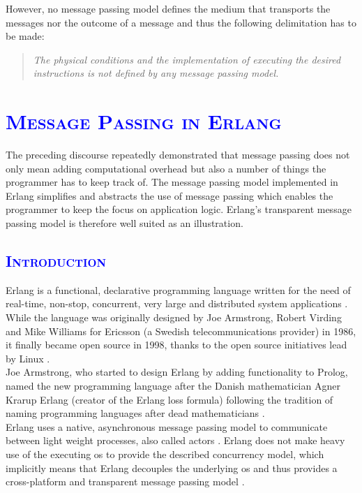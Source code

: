 \documentclass[xcolor=dvipsnames]{article}
\begin{document}
\noindent However, no message passing model defines the medium that transports the messages nor the outcome of a message and thus the following delimitation has to be made:

\begin{quote}
\textit{The physical conditions and the implementation of executing the desired instructions is not defined by any message passing model.}
\end{quote}

\section{\scshape{\textcolor{blue}{Message Passing in Erlang}}} \label{erlang}

The preceding discourse repeatedly demonstrated that message passing does not only mean adding computational overhead but also a number of things the programmer has to keep track of. The message passing model implemented in Erlang simplifies and abstracts the use of message passing which enables the programmer to keep the focus on application logic. Erlang's transparent message passing model is therefore well suited as an illustration.

\subsection{\scshape{\textcolor{blue}{Introduction}}}

Erlang is a functional, declarative programming language written for the need of real-time, non-stop, concurrent, very large and distributed system applications \cite[chap. 1 / p. 1]{Armstrong96erlang}. While the language was originally designed by Joe Armstrong, Robert Virding and Mike Williams for Ericsson (a Swedish telecommunications provider) in 1986, it finally became open source in 1998, thanks to the open source initiatives lead by Linux \cite[chap. 8 on p. 39]{erl_history}.\\

\noindent Joe Armstrong, who started to design Erlang by adding functionality to Prolog, named the new programming language after the Danish mathematician \sloppy Agner \sloppy Krarup  Erlang (creator of the Erlang loss formula) following the tradition of naming programming languages after dead mathematicians \cite[chap. 4.1 on p. 13]{erl_history}.\\

\noindent Erlang uses a native, asynchronous message passing model to communicate between light weight processes, also called actors \cite[chap. 1 on p. 1]{Armstrong96erlang}. Erlang does not make heavy use of the executing \gls{os} to provide the described concurrency model, which implicitly means that Erlang decouples the underlying \gls{os} and thus provides a cross-platform and transparent message passing model \cite[chap. 1  \& 3 on p. 1 - 3]{Armstrong96erlang}.
\end{document}
